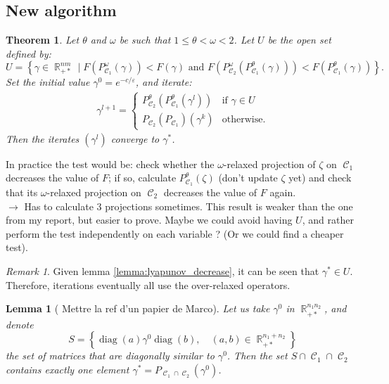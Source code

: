 \documentclass{article} %
\DeclareMathOperator{\IR}{\mathbb{R}}
\DeclareMathOperator{\Ccal}{\mathcal{C}}
\DeclareMathOperator{\diag}{diag}
\renewcommand{\epsilon}{\varepsilon}
\theoremstyle{plain}
\newtheorem{theorem}{Theorem}
\newtheorem{lemma}{Lemma}
\theoremstyle{definition}
\theoremstyle{remark}
\newtheorem{remark}{Remark}
\begin{document}
\subsection{New algorithm}

\begin{theorem}
	Let $\theta$ and $\omega$ be such that $1\le \theta < \omega < 2$. Let $U$ be the open set defined by:
	\begin{equation}\label{eq:open_set_U}
	U = \left\{
	\gamma \in \IR_{+*}^{nm} \mid
	F(P^\omega_{\Ccal_1}(\gamma)) < F(\gamma)
	\text{ and }
	F(P^\omega_{\Ccal_2}(P^\theta_{\Ccal_1}(\gamma))) < F(P^\theta_{\Ccal_1}(\gamma))
	\right\}.
	\end{equation}
	Set the initial value $\gamma^0 = e^{-c/\epsilon}$, and iterate:
	\begin{align*}
	\gamma^{l+1} =
	\begin{cases}
	P^\theta_{\Ccal_2}(P^\theta_{\Ccal_1}(\gamma^l)) & \text{if } \gamma \in U \\
	P_{\Ccal_2}(P_{\Ccal_1})(\gamma^k) & \text{otherwise.}
	\end{cases}
	\end{align*}
	Then the iterates $(\gamma^l)$ converge to $\gamma^*$.
\end{theorem}
{\color{red} 
	In practice the test would be: check whether the $\omega$-relaxed projection of $\zeta$ on $\Ccal_1$ decreases the value of
	$F$; if so, calculate $P_{\Ccal_1}^\theta(\zeta)$ (don't update $\zeta$ yet) and check that its $\omega$-relaxed projection on $\Ccal_2$ decreases the value of $F$ again. \\
	$\longrightarrow$ Has to calculate 3 projections sometimes. This result is weaker than the one from my report, but easier to prove. Maybe we could avoid having $U$, and rather perform the test independently on each variable ? (Or we could find a cheaper test).}
\begin{remark}
	Given lemma \ref{lemma:lyapunov_decrease}, it can be seen that $\gamma^* \in U$. Therefore, iterations eventually all use the over-relaxed operators.
\end{remark}

\begin{lemma}[{\color{red} Mettre la ref d'un papier de Marco}]
	\label{lemma:trivial_intersection}
	Let us take $\gamma^0$ in $\IR_{+*}^{n_1 n_2}$,
	and denote
	\[
	S = \left\{
	\diag(a) \gamma^0 \diag(b),\quad
	(a,b) \in \IR_{+*}^{n_1 + n_2}
	\right\}
	\]
	the set of matrices that are diagonally similar to $\gamma^0$.
	Then the set $S \cap \Ccal_1 \cap \Ccal_2$ contains exactly one element $\gamma^* = P_{\Ccal_1 \cap \Ccal_2}(\gamma^0)$.
\end{lemma}
\end{document}
